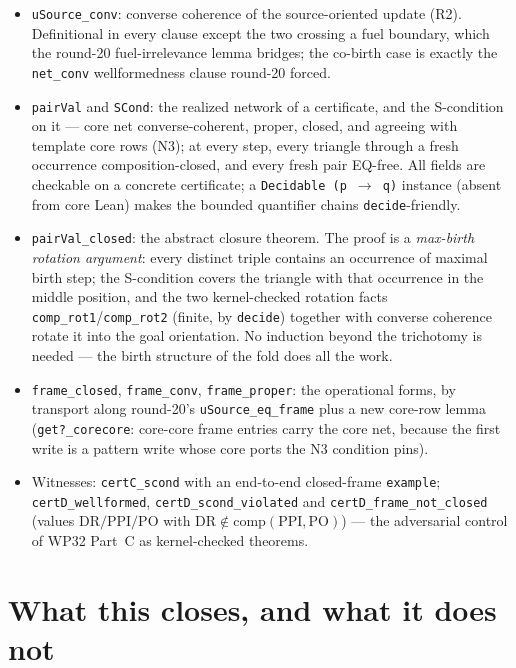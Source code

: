 \documentclass[11pt]{article}
\newcommand{\code}[1]{\texttt{#1}}
\newcommand{\comp}{\mathrm{comp}}
\begin{document}
\begin{itemize}[leftmargin=2em]
\item \code{uSource\_conv}: converse coherence of the source-oriented
update (R2).  Definitional in every clause except the two crossing a
fuel boundary, which the round-20 fuel-irrelevance lemma bridges; the
co-birth case is exactly the \code{net\_conv} wellformedness clause
round-20 forced.
\item \code{pairVal} and \code{SCond}: the realized network of a
certificate, and the S-condition on it --- core net converse-coherent,
proper, closed, and agreeing with template core rows (N3); at every
step, every triangle through a fresh occurrence composition-closed,
and every fresh pair EQ-free.  All fields are checkable on a concrete
certificate; a \code{Decidable (p \(\to\) q)} instance (absent from
core Lean) makes the bounded quantifier chains \code{decide}-friendly.
\item \code{pairVal\_closed}: the abstract closure theorem.  The proof
is a \emph{max-birth rotation argument}: every distinct triple contains
an occurrence of maximal birth step; the S-condition covers the
triangle with that occurrence in the middle position, and the two
kernel-checked rotation facts \code{comp\_rot1}/\code{comp\_rot2}
(finite, by \code{decide}) together with converse coherence rotate it
into the goal orientation.  No induction beyond the trichotomy is
needed --- the birth structure of the fold does all the work.
\item \code{frame\_closed}, \code{frame\_conv}, \code{frame\_proper}:
the operational forms, by transport along round-20's
\code{uSource\_eq\_frame} plus a new core-row lemma
(\code{get?\_corecore}: core-core frame entries carry the core net,
because the first write is a pattern write whose core ports the N3
condition pins).
\item Witnesses: \code{certC\_scond} with an end-to-end closed-frame
\code{example}; \code{certD\_wellformed},
\code{certD\_scond\_violated} and \code{certD\_frame\_not\_closed}
(values $\mathrm{DR}/\mathrm{PPI}/\mathrm{PO}$ with
$\mathrm{DR} \notin \comp(\mathrm{PPI},\mathrm{PO})$) --- the
adversarial control of WP32 Part~C as kernel-checked theorems.
\end{itemize}

\section{What this closes, and what it does not}
\end{document}
